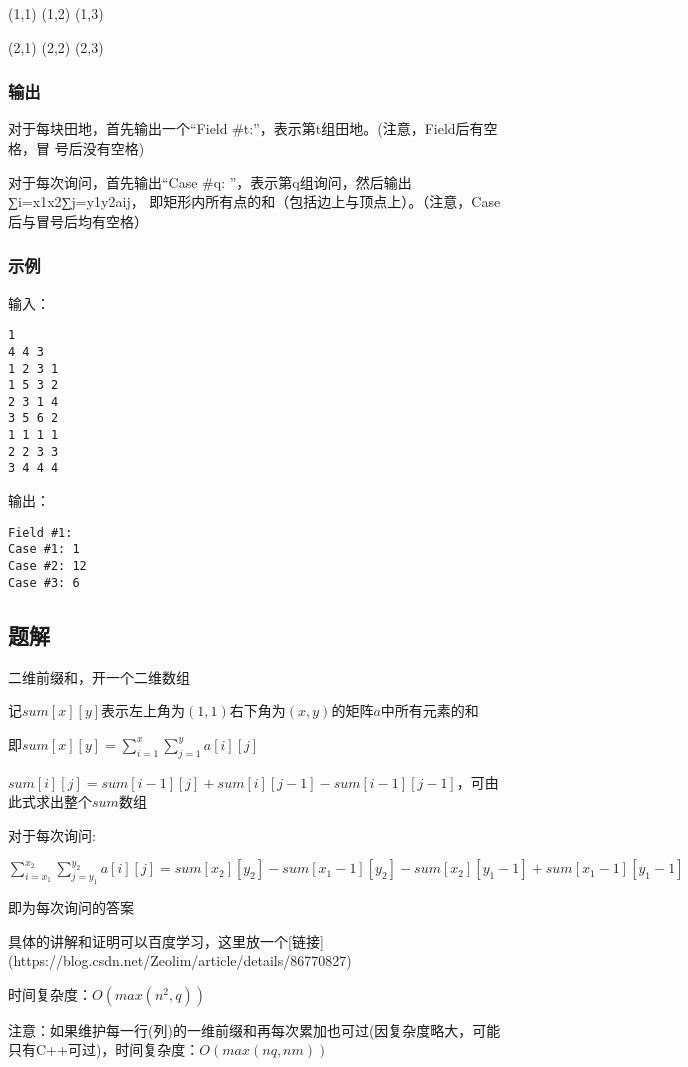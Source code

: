 (1,1) (1,2) (1,3)

(2,1) (2,2) (2,3)

\subsubsection{输出}
对于每块田地，首先输出一个“Field \#t:”，表示第t组田地。(注意，Field后有空格，冒
号后没有空格)

对于每次询问，首先输出“Case \#q: ”，表示第q组询问，然后输出∑i=x1x2∑j=y1y2aij，
即矩形内所有点的和（包括边上与顶点上）。（注意，Case后与冒号后均有空格）

\subsubsection{示例}
输入：
\begin{lstlisting}
1
4 4 3
1 2 3 1
1 5 3 2
2 3 1 4
3 5 6 2
1 1 1 1
2 2 3 3
3 4 4 4
\end{lstlisting}

输出：
\begin{lstlisting}
Field #1:
Case #1: 1
Case #2: 12
Case #3: 6
\end{lstlisting}

\subsection{题解}
二维前缀和，开一个二维数组

记$sum[x][y]$表示左上角为$(1, 1)$右下角为$(x, y)$的矩阵$a$中所有元素的和

即$sum[x][y] = \sum\limits_{i = 1}^{x}\sum\limits_{j = 1}^{y}{a[i][j]}$

$sum[i][j] = sum[i - 1][j] + sum[i][j - 1] - sum[i - 1][j - 1]$，可由此式求出整个$sum$数组

对于每次询问:

$\sum\limits_{i = x_1}^{x_2}\sum\limits_{j = y_1}^{y_2}{a[i][j]} = sum[x_2][y_2] - sum[x_1 - 1][y_2] - sum[x_2][y_1 - 1] + sum[x_1 - 1][y_1 - 1]$

即为每次询问的答案

具体的讲解和证明可以百度学习，这里放一个[链接](https://blog.csdn.net/Zeolim/article/details/86770827)

时间复杂度：$O(max(n^2, q))$

注意：如果维护每一行(列)的一维前缀和再每次累加也可过(因复杂度略大，可能只有C++可过)，时间复杂度：$O(max(nq, nm))$

